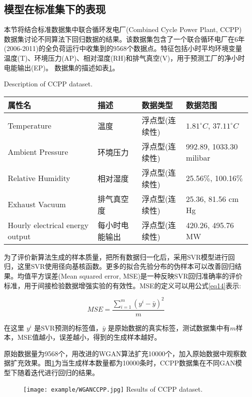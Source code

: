 \subsection{模型在标准集下的表现}
本节将结合标准数据集中联合循环发电厂(Combined Cycle Power Plant, CCPP)数据集讨论不同算法下回归数据的结果。该数据集包含了一个联合循环电厂在6年(2006-2011)的全负荷运行中收集到的9568个数据点。特征包括小时平均环境变量温度(T)、环境压力(AP)、相对湿度(RH)和排气真空(V)，用于预测工厂的净小时电能输出(EP)。
数据集的描述如表\ref{tabccpp}。
\begin{table}[htpb]
	\centering
	{Description of CCPP dataset.}
	\label{tabccpp}
	\begin{tabular}{llll} \toprule
		属性名   & 描述 & 数据类型&数据范围  \\  \midrule
		Temperature&温度&浮点型(连续性)&$1.81^\circ C$, $37.11^\circ C$\\
		Ambient Pressure&环境压力&浮点型(连续性)&992.89, 1033.30 milibar\\
		Relative Humidity&相对湿度&浮点型(连续性)& 25.56$\%$, 100.16$\%$ \\
		Exhaust Vacuum&排气真空度&浮点型(连续性)&25.36, 81.56 cm Hg\\
		Hourly electrical energy output&每小时电能输出&浮点型(连续性)&420.26, 495.76 MW\\ \bottomrule
	\end{tabular}
\end{table}


为了评价新算法生成的样本质量，把所有数据归一化后，采用SVR模型进行回归，这里SVR使用径向基核函数。更多的拟合先验分布的伪样本可以改善回归结果。均值平方误差(Mean squared error, MSE)是一种反映SVR回归准确率的评价标准，用于间接检验数据增强实验的有效性。MSE的定义可以用公式\ref{eq14}表示:

\begin{equation}
\label{eq14}
MSE=\frac{\sum \limits_{i=1}^m (y^{i}-\bar{y})^{2}}{m}
\end{equation}

在这里 $y^{i}$ 是SVR预测的标签值，$\bar{y}$ 是原始数据的真实标签，测试数据集中有$m$样本，MSE值越小，误差越小，得到的生成样本越好。

原始数据量为9568个，用改进的WGAN算法扩充10000个，加入原始数据中观察数据扩充效果。图\ref{figCCPP}为当生成样本数量都为10000条时，CCPP数据集在不同GAN模型下随着迭代进行回归的结果。
\begin{figure}[htbp]
	\centering
	\texttt{[image: example/WGANCCPP.jpg]}
	{Results of CCPP dataset.}
	\label{figCCPP}
\end{figure}

